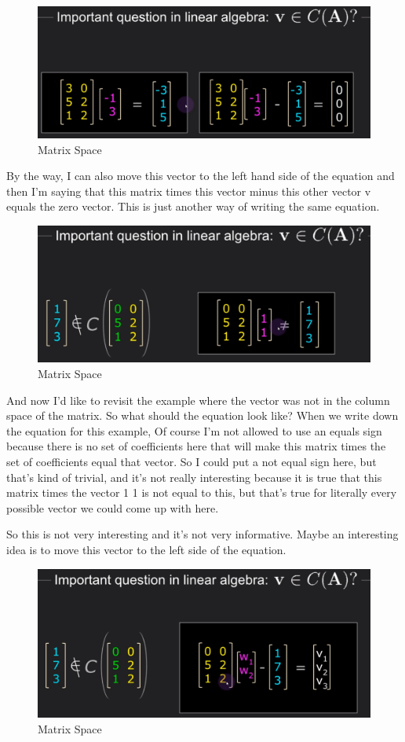 \documentclass[fleqn,10pt]{olplainarticle}
\theoremstyle{definition}
\theoremstyle{remark}
\begin{document}
\begin{figure}[ht]
	\centering
	\includegraphics[width=0.5\linewidth]{images/matrix-space-09.png}
	\caption{Matrix Space}
	\label{fig:matrix_space_09}
\end{figure}

By the way, I can also move this vector to the left hand side of the equation and then I'm saying that this matrix times this vector minus this other vector v equals the zero vector. This is just another way of writing the same equation.

\begin{figure}[ht]
	\centering
	\includegraphics[width=0.5\linewidth]{images/matrix-space-10.png}
	\caption{Matrix Space}
	\label{fig:matrix_space_10}
\end{figure}

And now I'd like to revisit the example where the vector was not in the column space of the matrix. So what should the equation look like? When we write down the equation for this example, Of course I'm not allowed to use an equals sign because there is no set of coefficients here that will make this matrix times the set of coefficients equal that vector. So I could put a not equal sign here, but that's kind of trivial, and it's not really interesting because it is true that this matrix times the vector 1 1 is not equal to this, but that's true for literally every possible vector we could come up with here.

So this is not very interesting and it's not very informative. Maybe an interesting idea is to move this vector to the left side of the equation. 

\begin{figure}[ht]
	\centering
	\includegraphics[width=0.5\linewidth]{images/matrix-space-11.png}
	\caption{Matrix Space}
	\label{fig:matrix_space_11}
\end{figure}
\end{document}
